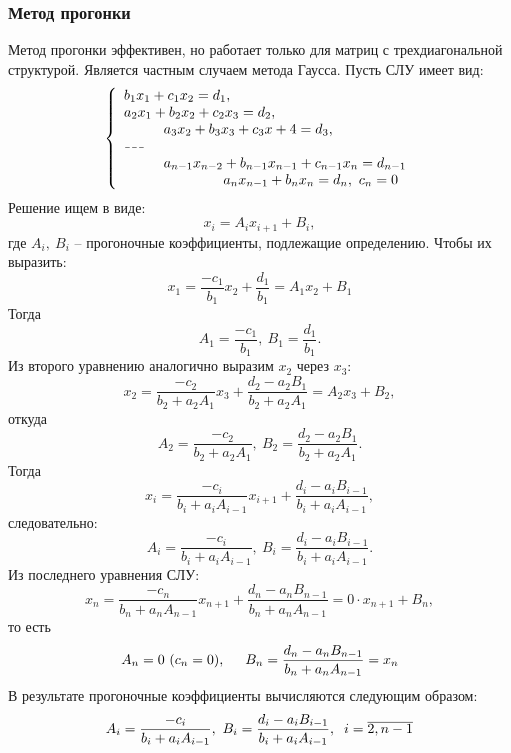 \begin{multicols}{2}
    \subsubsection*{Метод прогонки}
    Метод прогонки эффективен, но работает только для матриц с трехдиагональной структурой. Является частным случаем метода Гаусса.
    Пусть СЛУ имеет вид:
    \[
    \left\{
        \begin{array}{l}
            b_1 x_1 +  c_1 x_2  = d_1,\\
            a_2 x_1 +  b_2x_2+c_2x_3  =d_2,\\
            \hspace*{1cm} a_3x_2 + b_3x_3 + c_3 x+4 = d_3,\\
            \hdash \\
            \hspace*{1cm} a_{n-1} x_{n-2} + b_{n-1}x_{n-1} + c_{n-1}x_n = d_{n-1}\\
            \hspace*{2.5cm} a_{n}x_{n-1} + b_nx_n = d_n, \ c_n = 0
        \end{array}
    \right.    
    \]
    Решение ищем в виде:
    \[
        x_i = A_{i}x_{i+1} + B_i,
    \] 
    где $A_i, \ B_i$ -- прогоночные коэффициенты, подлежащие определению. Чтобы их выразить:
    \[
        x_1 = \dfrac{-c_1}{b_1}x_2 + \dfrac{d_1}{b_1} = A_1 x_2 + B_1
    \]
    Тогда
    \[
        A_1 = \dfrac{-c_1}{b_1}, \ B_1 = \dfrac{d_1}{b_1}.  
    \]
    Из второго уравнению аналогично выразим $x_2$ через $x_3$:
    \[
        x_2 = \dfrac{-c_2}{b_2 + a_2A_1} x_3 + \dfrac{d_2 - a_2B_1}{b_2 + a_2 A_1} = A_2 x_3 + B_2,
    \]
    откуда
    \[
        A_2 = \dfrac{-c_2}{b_2+a_2A_1}, \ B_2 = \dfrac{d_2 - a_2B_1}{b_2 + a_2A_1}.  
    \]
    Тогда 
    \[
        x_i = \dfrac{-c_i}{b_i + a_i A_{i-1}} x_{i+1} + \dfrac{d_i - a_i B_{i-1}}{b_i+a_iA_{i-1}},  
    \]
    следовательно:
    \[
        A_{i} = \dfrac{-c_i}{b_i + a_iA_{i-1}}, \ B_{i} = \dfrac{d_i - a_iB_{i-1}}{b_i + a_iA_{i-1}}.  
    \]
    Из последнего уравнения СЛУ:
    \[
        x_n = \dfrac{-c_n}{b_n + a_n A_{n-1}} x_{n+1} + \dfrac{d_n-a_nB_{n-1}}{b_n + a_nA_{n-1}} = 0 \cdot x_{n+1} + B_n, 
    \]
    то есть
    \[
        A_n = 0\ (c_n = 0), \hspace*{0.5cm} B_n = \dfrac{d_n-a_nB_{n-1}}{b_n+a_nA_{n-1}} = x_n  
    \]
    В результате прогоночные коэффициенты вычисляются следующим образом:
    \[
        A_i = \dfrac{-c_i}{b_i + a_i A_{i-1}}, \ B_{i} = \dfrac{d_i - a_i B_{i-1}}{b_i + a_i A_{i-1}}, \hspace*{0.2cm} i = \overline{2, n-1}
\]
\end{multicols}
